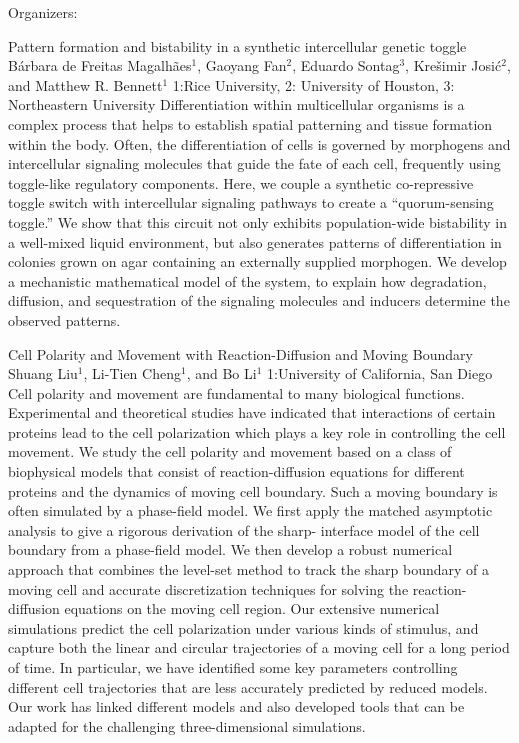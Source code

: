 \label{mini31}

\miniabs
{}
{Organizers: }
{}

\begin{addmargin}[2em]{0em}
\vspace{2ex}
\abs
{Pattern formation and bistability in a synthetic intercellular genetic toggle}
{B\'arbara de Freitas Magalh\~aes$^{1}$, Gaoyang Fan$^{2}$, Eduardo Sontag$^{3}$, Kre\v simir Josi\'c$^{2}$, and Matthew R. Bennett$^{1}$}
{1:Rice University, 2: University of Houston, 3: Northeastern University}
{Differentiation within multicellular organisms is a complex process that helps to establish spatial patterning and tissue formation within the body. Often, the differentiation of cells is governed by morphogens and intercellular signaling molecules that guide the fate of each cell, frequently using toggle-like regulatory components. Here, we couple a synthetic co-repressive toggle switch with intercellular signaling pathways to create a ``quorum-sensing toggle.'' We show that this circuit not only exhibits population-wide bistability in a well-mixed liquid environment, but also generates patterns of differentiation in colonies grown on agar containing an externally supplied morphogen. We develop a mechanistic mathematical model of the system, to explain how degradation, diffusion, and sequestration of the signaling molecules and inducers determine the observed patterns.}


\vspace{1.5ex}
\abs
{Cell Polarity and Movement with Reaction-Diffusion and Moving Boundary}
{Shuang Liu$^{1}$, Li-Tien Cheng$^{1}$, and Bo Li$^{1}$}
{1:University of California, San Diego}
{Cell polarity and movement are fundamental to many biological functions. Experimental and theoretical studies have indicated that interactions of certain proteins lead to the cell polarization which plays a key role in controlling the cell movement. We study the cell polarity and movement based on a class of biophysical models that consist of reaction-diffusion equations for different proteins and the dynamics of moving cell boundary. Such a moving boundary is often simulated by a phase-field model. We first apply the matched asymptotic analysis to give a rigorous derivation of the sharp- interface model of the cell boundary from a phase-field model. We then develop a robust numerical approach that combines the level-set method to track the sharp boundary of a moving cell and accurate discretization techniques for solving the reaction-diffusion equations on the moving cell region. Our extensive numerical simulations predict the cell polarization under various kinds of stimulus, and capture both the linear and circular trajectories of a moving cell for a long period of time. In particular, we have identified some key parameters controlling different cell trajectories that are less accurately predicted by reduced models. Our work has linked different models and also developed tools that can be adapted for the challenging three-dimensional simulations.}



\end{addmargin}
